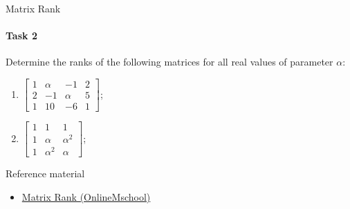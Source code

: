 \documentclass[aspectratio=169]{beamer}
\newcommand{\fbckg}[1]{\usebackgroundtemplate{\texttt{[image: \#1]}}}%
\begin{document}
\begin{frame}[t]{Matrix Rank}
\framesubtitle{Task 2}
Determine the ranks of the following matrices for all real values of parameter $\alpha$:
\begin{enumerate}

    \item $\begin{bmatrix}1&\alpha&-1&2\\2&-1&\alpha&5\\1&10&-6&1\end{bmatrix}$;
    \item $\begin{bmatrix}1&1&1\\1&\alpha&\alpha^2\\1&\alpha^2&\alpha\end{bmatrix}$;
\end{enumerate}
\end{frame}


\begin{frame}[t]{Reference material}
    \Large
    \begin{itemize}
        \item \href{https://onlinemschool.com/math/library/matrix/rank/}{Matrix Rank (OnlineMschool)}
    \end{itemize}
\end{frame}

\fbckg{fibeamer/figs/last_page.png}
\frame[plain]{}
\end{document}
